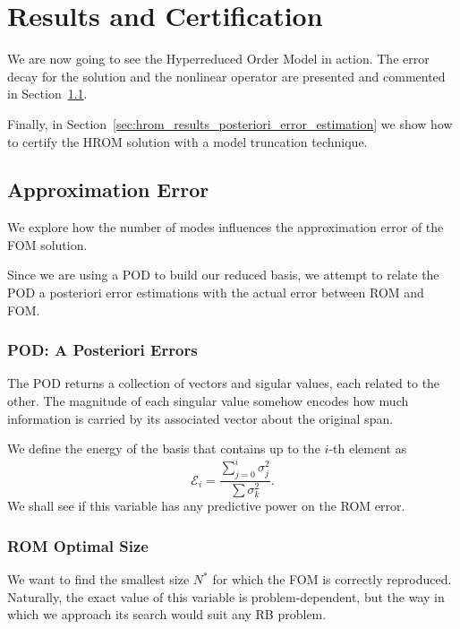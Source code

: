 \documentclass[../../thesis.tex]{subfiles}
\begin{document}
\section{Results and Certification}
We are now going to see the Hyperreduced Order Model in action.
The error decay for the solution and the nonlinear operator 
are presented and commented in Section~\ref{sec:hrom_results_reduced_basis}.

Finally, in Section~\ref{sec:hrom_results_posteriori_error_estimation} we show 
how to certify the HROM solution with a model truncation technique.  

\subsection{Approximation Error}
\label{sec:hrom_results_reduced_basis}
We explore how the number of modes influences the approximation error of the FOM solution.

Since we are using a POD to build our reduced basis, 
we attempt to relate the POD a posteriori error estimations with 
the actual error between ROM and FOM.

\subsubsection{POD: A Posteriori Errors}
The POD returns a collection of vectors and sigular values, each related to the other.
The magnitude of each singular value somehow encodes 
how much information is carried by its associated vector about the original span.

We define the energy of the basis that contains up to the $i$-th element as
\begin{equation}
    \mathcal{E}_i = \frac{\sum_{j=0}^{i}\sigma_j^2}{\sum \sigma_k^2}.
\end{equation}
We shall see if this variable has any predictive power on the ROM error.

\subsubsection{ROM Optimal Size}
We want to find the smallest size $N^{*}$ for which the FOM is correctly reproduced.
Naturally, the exact value of this variable is problem-dependent, 
but the way in which we approach its search would suit any RB problem.
\end{document}
